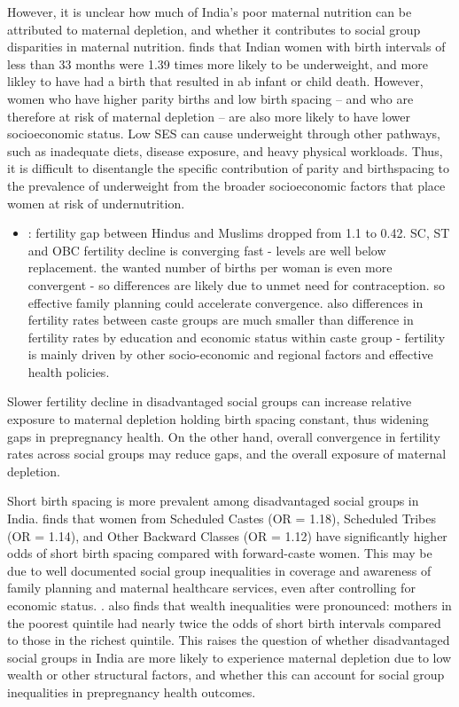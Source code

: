 However, it is unclear how much of India's poor maternal nutrition can be attributed to maternal depletion, and whether it contributes to social group disparities in maternal nutrition. \cite{kundu2025short} finds that Indian women with birth intervals of less than 33 months were 1.39 times more likely to be underweight, and more likley to have had a birth that resulted in ab infant or child death. However, women who have higher parity births and low birth spacing -- and who are therefore at risk of maternal depletion -- are also more likely to have lower socioeconomic status.  Low SES can cause underweight through other pathways, such as inadequate diets, disease exposure, and heavy physical workloads. Thus, it is difficult to disentangle the specific contribution of parity and birthspacing to the prevalence of underweight from the broader socioeconomic factors that place women at risk of undernutrition.


\begin{itemize}
    \item \cite{srinivas2024rapid}: fertility gap between Hindus and Muslims dropped from 1.1 to 0.42. SC, ST and OBC fertility decline is converging fast  - levels are well below replacement. the wanted number of births per woman is even more convergent - so differences are likely due to unmet need for contraception. so effective family planning could accelerate convergence. also differences in fertility rates between caste groups are much smaller than difference in fertility rates by education and economic status within caste group - fertility is mainly driven by other socio-economic and regional factors and effective health policies.
\end{itemize}

Slower fertility decline in disadvantaged social groups can increase relative exposure to maternal depletion holding birth spacing constant, thus widening gaps in prepregnancy health. On the other hand, overall convergence in fertility rates across social groups may reduce gaps, and the overall exposure of maternal depletion. 


Short birth spacing is more prevalent among disadvantaged social groups in India. \cite{singh2024wealth} finds that women from Scheduled Castes (OR = 1.18), Scheduled Tribes (OR = 1.14), and Other Backward Classes (OR = 1.12) have significantly higher odds of short birth spacing compared with forward-caste women. This may be due to well documented social group inequalities in coverage and awareness of family planning and maternal healthcare services, even after controlling for economic status. \citep{kumar2016explaining}. \cite{singh2024wealth} also finds that wealth inequalities were pronounced: mothers in the poorest quintile had nearly twice the odds of short birth intervals compared to those in the richest quintile. This raises the question of whether disadvantaged social groups in India are more likely to experience maternal depletion due to low wealth or other structural factors, and whether this can account for social group inequalities in prepregnancy health outcomes.

